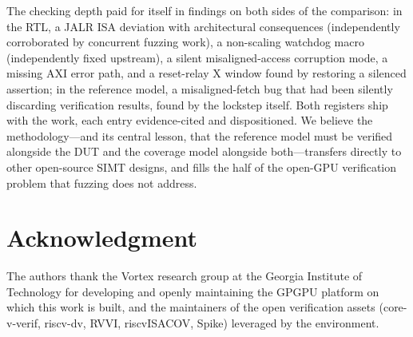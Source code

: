 \documentclass[conference]{IEEEtran}
\begin{document}
The checking depth paid for itself in findings on both sides of the
comparison: in the RTL, a JALR ISA deviation with architectural
consequences (independently corroborated by concurrent fuzzing work), a
non-scaling watchdog macro (independently fixed upstream), a silent
misaligned-access corruption mode, a missing AXI error path, and a
reset-relay X window found by restoring a silenced assertion; in the
reference model, a misaligned-fetch bug that had been silently
discarding verification results, found by the lockstep itself. Both
registers ship with the work, each entry evidence-cited and
dispositioned. We believe the methodology---and its central lesson, that
the reference model must be verified alongside the DUT and the coverage
model alongside both---transfers directly to other open-source SIMT
designs, and fills the half of the open-GPU verification problem that
fuzzing does not address.

\section*{Acknowledgment}
The authors thank the Vortex research group at the Georgia Institute of
Technology for developing and openly maintaining the GPGPU platform on
which this work is built, and the maintainers of the open verification
assets (core-v-verif, riscv-dv, RVVI, riscvISACOV, Spike) leveraged by
the environment.
\end{document}
